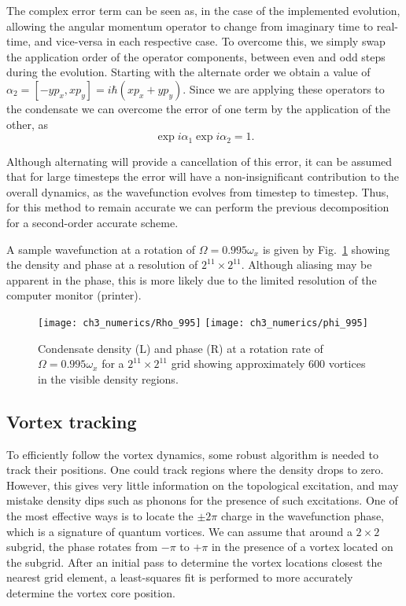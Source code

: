  The complex error term can be seen as, in the case of the implemented evolution, allowing the angular momentum operator to change from imaginary time to real-time, and vice-versa in each respective case. To overcome this, we simply swap the application order of the operator components, between even and odd steps during the evolution. Starting with the alternate order we obtain a value of $\alpha_2 = [-y p_x, x p_y] = i\hbar \left(x p_x + y p_y \right)$. Since we are applying these operators to the condensate we can overcome the error of one term by the application of the other, as
 \begin{equation}
 \exp{i \alpha_1}\exp{i \alpha_2} = 1.
 \end{equation}

 Although alternating will provide a cancellation of this error, it can be assumed that for large timesteps the error will have a non-insignificant contribution to the overall dynamics, as the wavefunction evolves from timestep to timestep. Thus, for this method to remain accurate we can perform the previous decomposition for a second-order accurate scheme.

 A sample wavefunction at a rotation of $\Omega = 0.995\omega_x$ is given by Fig.~\ref{fig:showingoff} showing the density and phase at a resolution of $2^{11}\times 2^{11}$. Although aliasing may be apparent in the phase, this is more likely due to the limited resolution of the computer monitor (printer).

 \begin{figure}
     \centering
     \texttt{[image: ch3\_numerics/Rho\_995]}
     \texttt{[image: ch3\_numerics/phi\_995]}
     \caption{Condensate density (L) and phase (R) at a rotation rate of $\Omega=0.995\omega_x$ for a $2^{11}\times 2^{11}$ grid showing approximately 600 vortices in the visible density regions.}
     \label{fig:showingoff}
 \end{figure}

 \subsection{Vortex tracking}
 To efficiently follow the vortex dynamics, some robust algorithm is needed to track their positions. One could track regions where the density drops to zero. However, this gives very little information on the topological excitation, and may mistake density dips such as phonons for the presence of such excitations. One of the most effective ways is to locate the $\pm 2\pi$ charge in the wavefunction phase, which is a signature of quantum vortices. We can assume that around a $2\times 2$ subgrid, the phase rotates from $-\pi$ to $+\pi$ in the presence of a vortex located on the subgrid. After an initial pass to determine the vortex locations closest the nearest grid element, a least-squares fit is performed to more accurately determine the vortex core position.

